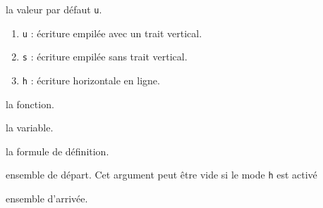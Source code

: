 \documentclass[12pt,a4paper]{article}
\begin{document}


\IDoption{}  la valeur par défaut \verb+u+. 
\begin{enumerate}
	\item \verb+u+ : écriture empilée avec un trait vertical.
	
	\item \verb+s+ : écriture empilée sans trait vertical.

	\item \verb+h+ : écriture horizontale en ligne.
\end{enumerate}


 la fonction.

 la variable.

 la formule de définition.

 ensemble de départ. Cet argument peut être vide si le mode \verb+h+ est activé

 ensemble d'arrivée.
\end{document}
